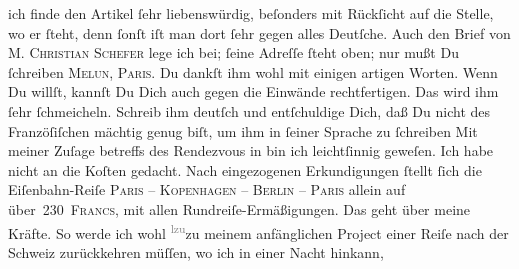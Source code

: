 \begin{ledgroupsized}[t]{13cm}
               ich finde den Artikel ſehr
               liebenswürdig, beſonders mit Rückſicht auf die Stelle, wo er  ſteht,
               denn ſonſt iſt man dort ſehr gegen alles Deutſche. Auch den Brief von \textsc{M. Christian Schefer} lege ich bei; ſeine Adreſſe ſteht oben; nur mußt Du ſchreiben \textsc{Melun, \label{K_L02777-2v}\label{K_L02777-2h}
                     Paris}. Du dankſt ihm wohl mit einigen artigen Worten. {\pb}Wenn Du willſt, kannſt Du Dich auch gegen die
               Einwände rechtfertigen. Das wird ihm ſehr ſchmeicheln. Schreib ihm deutſch und
               entſchuldige Dich, daß Du nicht des Franzöſiſchen mächtig genug biſt, um ihm in
               ſeiner Sprache zu ſchreiben{\dotsfive}\pend
           \pstart
           Mit meiner Zuſage betreffs des Rendezvous in \label{K_L02777-3v}\label{K_L02777-3h} bin ich leichtſinnig geweſen. Ich habe nicht an die Koſten gedacht. Nach
               eingezogenen Erkundigungen ſtellt ſich die Eiſenbahn-Reiſe \textsc{Paris – Kopenhagen – Berlin – Paris} allein {\pb}auf über 230 \textsc{Francs}, mit allen Rundreiſe-Ermäßigungen. Das geht über meine Kräfte. So
               werde ich wohl \substVorne{}\textsuperscript{\textcolor{gray}{lzu}}\substDazwischen{}zu\substHinten{} meinem anfänglichen Project einer Reiſe nach der Schweiz zurückkehren müſſen, wo ich in einer Nacht hinkann,

\end{ledgroupsized}

